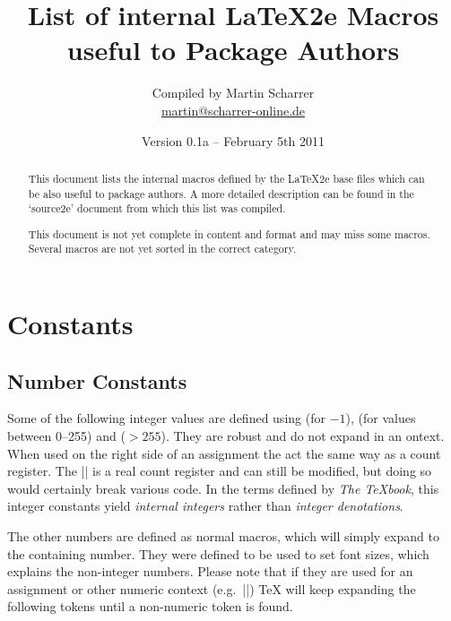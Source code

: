 \documentclass[12pt]{article}
\title{List of internal \LaTeX2e Macros useful to Package Authors}
\author{Compiled by Martin Scharrer\\\url{martin@scharrer-online.de}}
\date{Version 0.1a -- February 5th 2011}
\begin{document}
\maketitle
\begin{abstract}
This document lists the internal macros defined by the \LaTeX2e base files which can be also useful
to package authors.  A more detailed description can be found in the `source2e' document from which
this list was compiled.

This document is not yet complete in content and format and may miss some macros. Several macros are
not yet sorted in the correct category.
\end{abstract}

\tableofcontents

\clearpage

\section{Constants}

\subsection{Number Constants}

Some of the following integer values are defined using \Macro\countdef\relax (for $-1$),
\Macro\chardef\relax (for values between 0--255) and \Macro\mathchardef\relax ($>255$).  They are
robust and do not expand in an \Macro\edef\relax context. When used on the right side of an
assignment the act the same way as a count register.  The |\m@ne| is a real count register and can
still be modified, but doing so would certainly break various code.  In the terms defined by
\emph{The TeXbook}, this integer constants yield \emph{internal integers} rather than \emph{integer
denotations}.

The other numbers are defined as normal macros, which will simply expand to the containing number.
They were defined
to be used to set font sizes, which explains the non-integer numbers.  Please note that if they
are used for an assignment or other numeric context (e.g.\ |\ifnum|) TeX will keep expanding the
following tokens until a non-numeric token is found.%
\end{document}
